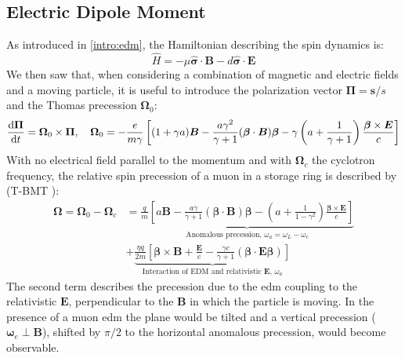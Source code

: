 \begin{refsection}
\section{Electric Dipole Moment}
    As introduced in \ref{intro:edm}, the Hamiltonian describing the spin dynamics is:
    \begin{equation*}
        \hat{H} = -\mu\bm{\hat{\sigma}\cdot B}-d\bm{\hat{\sigma}\cdot E}
    \end{equation*}
    We then saw that, when considering a combination of magnetic and electric fields and a moving particle, it is useful to introduce the polarization vector $\bm{\Pi}=\bm{s}/s$ and the Thomas precession $\bm{\Omega}_0$:
    \begin{equation*}
        \dv{\bm{\Pi}}{t}=\bm{\Omega}_0 \times \bm{\Pi}, \quad
        \bm{\Omega}_0 = -\frac{e}{m\gamma} \left[ (1+\gamma a)\bm{B}-\frac{a\gamma^2}{\gamma+1}(\bm{\beta}\cdot\bm{B})\bm{\beta}-\gamma \left( a+\frac{1}{\gamma+1} \right) \frac{\bm{\beta}\times \bm{E}}{c} \right]
    \end{equation*}
    With no electrical field parallel to the momentum and with $\bm{\Omega}_c$ the cyclotron frequency, the relative spin precession of a muon in a storage ring is described by (T-BMT \cite{T-BMT}):
    \begin{equation}
        \begin{split}
            \bm{\Omega}=\bm{\Omega}_0-\bm{\Omega}_c &=
            \underbrace{ 
                \frac{q}{m}\left[ a\bm{B} -{\frac{a\gamma}{\gamma+1}(\bm{\beta}\cdot \bm{B})\bm{\beta}} - \left(  a+\frac{1}{1-\gamma^2}\right)\frac{\bm{\beta} \times \bm{E}}{c} \right]
            }_{\text{Anomalous precession, } \omega_a=\omega_L-\omega_c} \\&+
            \underbrace{
                \frac{\eta q}{2m}\left[ \bm{\beta} \times \bm{B} + \frac{\bm{E}}{c}- {\frac{\gamma c}{\gamma+1}(\bm{\beta}\cdot\bm{E\beta})} \right]
            }_{\text{Interaction of EDM and relativistic $\bm{E}$, } \omega_a}
        \end{split}
        \label{eq:muedm:precession}
    \end{equation}
    The second term describes the precession due to the \gls{edm} coupling to the relativistic $\bm{E}$, perpendicular to the $\bm{B}$ in which the particle is moving. 
    In the presence of a muon \gls{edm} the plane would be tilted and a vertical precession ($\bm{\omega}_e\perp\bm{B}$), shifted by $\pi/2$ to the horizontal anomalous precession, would become observable.


\end{refsection}
